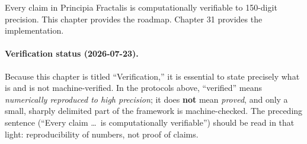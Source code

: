 Every claim in Principia Fractalis is computationally verifiable to 150-digit precision. This chapter provides the roadmap. Chapter 31 provides the implementation.

\paragraph{Verification status (2026-07-23).}
Because this chapter is titled ``Verification,'' it is essential to state precisely what is and is not machine-verified. In the protocols above, ``verified'' means \emph{numerically reproduced to high precision}; it does \textbf{not} mean \emph{proved}, and only a small, sharply delimited part of the framework is machine-checked. The preceding sentence (``Every claim \ldots\ is computationally verifiable'') should be read in that light: reproducibility of numbers, not proof of claims.
